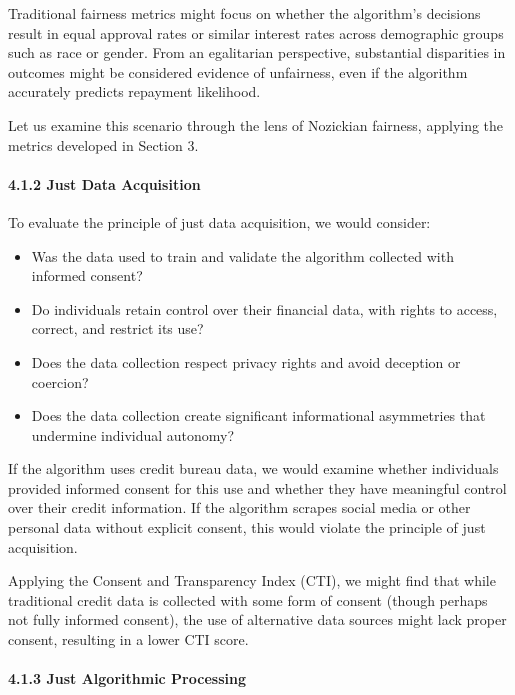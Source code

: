 Traditional fairness metrics might focus on whether the algorithm's
decisions result in equal approval rates or similar interest rates
across demographic groups such as race or gender. From an egalitarian
perspective, substantial disparities in outcomes might be considered
evidence of unfairness, even if the algorithm accurately predicts
repayment likelihood.

Let us examine this scenario through the lens of Nozickian fairness,
applying the metrics developed in Section 3.

\paragraph{4.1.2 Just Data Acquisition}\label{just-data-acquisition}

To evaluate the principle of just data acquisition, we would consider:

\begin{itemize}
\tightlist
\item
  Was the data used to train and validate the algorithm collected with
  informed consent?
\item
  Do individuals retain control over their financial data, with rights
  to access, correct, and restrict its use?
\item
  Does the data collection respect privacy rights and avoid deception or
  coercion?
\item
  Does the data collection create significant informational asymmetries
  that undermine individual autonomy?
\end{itemize}

If the algorithm uses credit bureau data, we would examine whether
individuals provided informed consent for this use and whether they have
meaningful control over their credit information. If the algorithm
scrapes social media or other personal data without explicit consent,
this would violate the principle of just acquisition.

Applying the Consent and Transparency Index (CTI), we might find that
while traditional credit data is collected with some form of consent
(though perhaps not fully informed consent), the use of alternative data
sources might lack proper consent, resulting in a lower CTI score.

\paragraph{4.1.3 Just Algorithmic
Processing}\label{just-algorithmic-processing}

